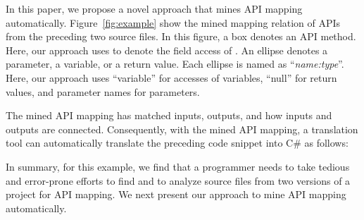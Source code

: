 In this paper, we propose a novel approach that mines API mapping
automatically. Figure~\ref{fig:example} show the mined mapping
relation of APIs from the preceding two source files. In this
figure, a box denotes an API method. Here, our approach uses
 to denote the field access of
. An ellipse denotes a parameter, a variable, or a
return value. Each ellipse is named as ``\emph{name:type}''. Here,
our approach uses ``variable'' for accesses of variables, ``null''
for return values, and parameter names for parameters.


The mined API mapping has matched inputs, outputs, and how inputs
and outputs are connected. Consequently, with the mined API mapping,
a translation tool can automatically translate the preceding code
snippet into C\# as follows:



In summary, for this example, we find that a programmer needs to
take tedious and error-prone efforts to find and to analyze source
files from two versions of a project for API mapping. We next
present our approach to mine API mapping automatically.


